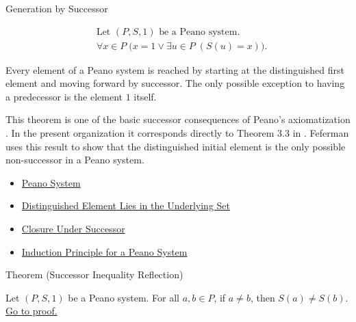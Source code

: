 \begin{topicbox}{Generation by Successor}
\begin{remark*}
\[
\begin{aligned}
&\text{Let } (P,S,1) \text{ be a Peano system.}\\
&\forall x \in P\;\bigl(x=1 \lor \exists u \in P\;(S(u)=x)\bigr).
\end{aligned}
\]
\end{remark*}

\begin{remark*}[Interpretation]
Every element of a Peano system is reached by starting at the distinguished
first element and moving forward by successor. The only possible exception to
having a predecessor is the element $1$ itself.
\end{remark*}

\begin{remark*}
This theorem is one of the basic successor consequences of Peano's
axiomatization \citep{PeanoArithmeticesPrincipia1889}. In the present
organization it corresponds directly to Theorem 3.3 in
\citet{FefermanNumberSystems1964}. Feferman uses this result to show that
the distinguished initial element is the only possible non-successor in a
Peano system.
\end{remark*}

\begin{dependencies}
\begin{itemize}
  \item \hyperref[def:peano-system]{Peano System}
  \item \hyperref[ax:peano-base-in-set]{Distinguished Element Lies in the Underlying Set}
  \item \hyperref[ax:peano-successor-closure]{Closure Under Successor}
  \item \hyperref[thm:induction-principle-for-peano-system]{Induction Principle for a Peano System}
\end{itemize}
\end{dependencies}

\begin{theorembox}{Theorem (Successor Inequality Reflection)}
\begin{theorem}
\label{thm:successor-inequality-reflection}
Let $(P,S,1)$ be a Peano system. For all $a,b \in P$, if $a \neq b$, then
$S(a)\neq S(b)$.
\hyperref[prf:successor-inequality-reflection]{Go to proof.}
\end{theorem}
\end{theorembox}


\end{topicbox}
